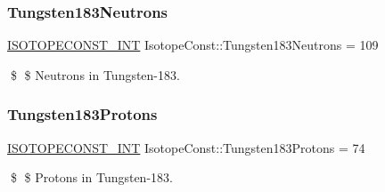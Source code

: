 \subsubsection{\texorpdfstring{Tungsten183\+Neutrons}{Tungsten183Neutrons}}
{\footnotesize\ttfamily \mbox{\hyperlink{group___isotope_const-_macros_ga5f18360b3e99483a35c32d789e62621c}{I\+S\+O\+T\+O\+P\+E\+C\+O\+N\+S\+T\+\_\+\+I\+NT}} Isotope\+Const\+::\+Tungsten183\+Neutrons = 109}

\$ \$ Neutrons in Tungsten-\/183. \mbox{\label{group___isotope_const-_tungsten-_w183_ga7f866673fe01b627484879a45d7ba610}} 
\subsubsection{\texorpdfstring{Tungsten183\+Protons}{Tungsten183Protons}}
{\footnotesize\ttfamily \mbox{\hyperlink{group___isotope_const-_macros_ga5f18360b3e99483a35c32d789e62621c}{I\+S\+O\+T\+O\+P\+E\+C\+O\+N\+S\+T\+\_\+\+I\+NT}} Isotope\+Const\+::\+Tungsten183\+Protons = 74}

\$ \$ Protons in Tungsten-\/183. 